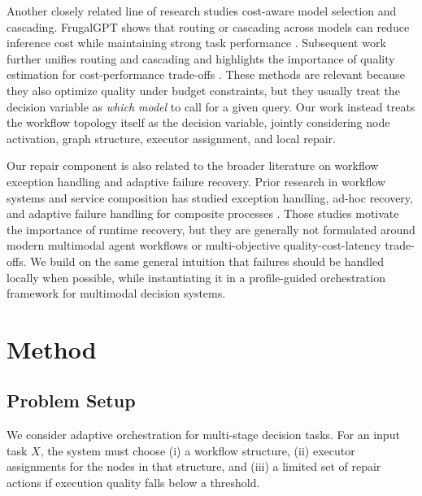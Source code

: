 \documentclass[manuscript,review,anonymous]{acmart}
\begin{document}
Another closely related line of research studies cost-aware model selection and cascading. FrugalGPT shows that routing or cascading across models can reduce inference cost while maintaining strong task performance \cite{chen2023frugalgpt}. Subsequent work further unifies routing and cascading and highlights the importance of quality estimation for cost-performance trade-offs \cite{dekoninck2024routing}. These methods are relevant because they also optimize quality under budget constraints, but they usually treat the decision variable as \emph{which model} to call for a given query. Our work instead treats the workflow topology itself as the decision variable, jointly considering node activation, graph structure, executor assignment, and local repair.

Our repair component is also related to the broader literature on workflow exception handling and adaptive failure recovery. Prior research in workflow systems and service composition has studied exception handling, ad-hoc recovery, and adaptive failure handling for composite processes \cite{chiu2001exception,sato2010adaff}. Those studies motivate the importance of runtime recovery, but they are generally not formulated around modern multimodal agent workflows or multi-objective quality-cost-latency trade-offs. We build on the same general intuition that failures should be handled locally when possible, while instantiating it in a profile-guided orchestration framework for multimodal decision systems.









\section{Method}
\label{sec:method}

\subsection{Problem Setup}

We consider adaptive orchestration for multi-stage decision tasks. For an input task $X$, the system must choose (i) a workflow structure, (ii) executor assignments for the nodes in that structure, and (iii) a limited set of repair actions if execution quality falls below a threshold.
\end{document}
